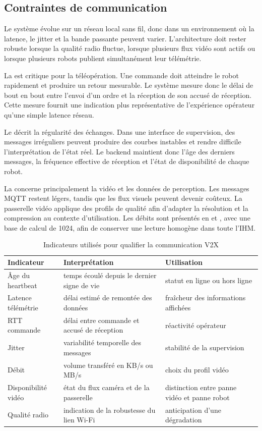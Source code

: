 \subsection{Contraintes de communication}

Le système évolue sur un réseau local sans fil, donc dans un environnement où la latence, le jitter et la bande passante peuvent varier. L'architecture doit rester robuste lorsque la qualité radio fluctue, lorsque plusieurs flux vidéo sont actifs ou lorsque plusieurs robots publient simultanément leur télémétrie.

La  est critique pour la téléopération. Une commande doit atteindre le robot rapidement et produire un retour mesurable. Le système mesure donc le délai de bout en bout entre l'envoi d'un ordre et la réception de son accusé de réception. Cette mesure fournit une indication plus représentative de l'expérience opérateur qu'une simple latence réseau.

Le  décrit la régularité des échanges. Dans une interface de supervision, des messages irréguliers peuvent produire des courbes instables et rendre difficile l'interprétation de l'état réel. Le backend maintient donc l'âge des derniers messages, la fréquence effective de réception et l'état de disponibilité de chaque robot.

La  concerne principalement la vidéo et les données de perception. Les messages MQTT restent légers, tandis que les flux visuels peuvent devenir coûteux. La passerelle vidéo applique des profils de qualité afin d'adapter la résolution et la compression au contexte d'utilisation. Les débits sont présentés en  et , avec une base de calcul de 1024, afin de conserver une lecture homogène dans toute l'IHM.

\begin{table}[H]
\centering
\small
\renewcommand{\arraystretch}{1.18}
\begin{tabular}{|p{3.5cm}|p{5.6cm}|p{4.5cm}|}
\hline
\textbf{Indicateur} & \textbf{Interprétation} & \textbf{Utilisation} \\
\hline
Âge du heartbeat & temps écoulé depuis le dernier signe de vie & statut en ligne ou hors ligne \\
\hline
Latence télémétrie & délai estimé de remontée des données & fraîcheur des informations affichées \\
\hline
RTT commande & délai entre commande et accusé de réception & réactivité opérateur \\
\hline
Jitter & variabilité temporelle des messages & stabilité de la supervision \\
\hline
Débit & volume transféré en KB/s ou MB/s & choix du profil vidéo \\
\hline
Disponibilité vidéo & état du flux caméra et de la passerelle & distinction entre panne vidéo et panne robot \\
\hline
Qualité radio & indication de la robustesse du lien Wi-Fi & anticipation d'une dégradation \\
\hline
\end{tabular}
\caption{Indicateurs utilisés pour qualifier la communication V2X}
\label{tab:v2x_qos_v2}
\end{table}

